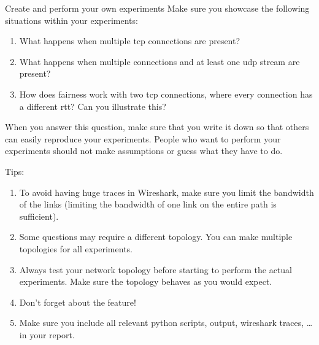 \begin{exercise}{Create and perform your own experiments}
Make sure you showcase the following situations within your experiments:
\begin{enumerate}
	\item What happens when multiple \ac{tcp} connections are present?
	\item What happens when multiple connections and at least one \ac{udp} stream are present?
	\item How does fairness work with two \ac{tcp} connections, where every connection has a different \ac{rtt}? Can you illustrate this?
\end{enumerate}
When you answer this question, make sure that you write it down so that others can easily reproduce your experiments. People who want to perform your experiments should not make assumptions or guess what they have to do.

Tips:
\begin{enumerate}
	\item To avoid having huge traces in Wireshark, make sure you limit the bandwidth of the links (limiting the bandwidth of one link on the entire path is sufficient).
	\item Some questions may require a different topology. You can make multiple topologies for all experiments.
	\item Always test your network topology before starting to perform the actual experiments. Make sure the topology behaves as you would expect.
	\item Don't forget about the  feature!
	\item Make sure you include all relevant python scripts, output, wireshark traces, \ldots in your report.
\end{enumerate}

\end{exercise}